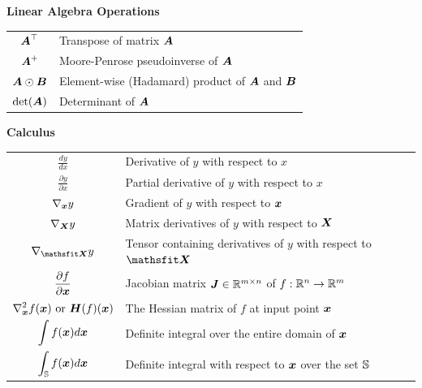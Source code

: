 \vspace{\notationgap}
\noindent\begin{minipage}{\textwidth}
\centerline{\bf Linear Algebra Operations}
\bgroup
\def\arraystretch{1.5}
\begin{tabular}{cp{3.25in}}
$\displaystyle {\bm{A}}^\top$ & Transpose of matrix ${\bm{A}}$ \\
$\displaystyle {\bm{A}}^+$ & Moore-Penrose pseudoinverse of ${\bm{A}}$\\
$\displaystyle {\bm{A}} \odot {\bm{B}} $ & Element-wise (Hadamard) product of ${\bm{A}}$ and ${\bm{B}}$ \\
$\displaystyle \mathrm{det}({\bm{A}})$ & Determinant of ${\bm{A}}$ \\
\end{tabular}
\egroup
{}
\end{minipage}

\vspace{\notationgap}
\noindent\begin{minipage}{\textwidth}
\centerline{\bf Calculus}
\bgroup
\def\arraystretch{1.5}
\begin{tabular}{cp{3.25in}}
$\displaystyle\frac{d y} {d x}$ & Derivative of $y$ with respect to $x$\\ [2ex]
$\displaystyle \frac{\partial y} {\partial x} $ & Partial derivative of $y$ with respect to $x$ \\
$\displaystyle \nabla_{\bm{x}} y $ & Gradient of $y$ with respect to ${\bm{x}}$ \\
$\displaystyle \nabla_{\bm{X}} y $ & Matrix derivatives of $y$ with respect to ${\bm{X}}$ \\
$\displaystyle \nabla_\tX y $ & Tensor containing derivatives of $y$ with respect to $\tX$ \\
$\displaystyle \frac{\partial f}{\partial {\bm{x}}} $ & Jacobian matrix ${\bm{J}} \in \mathbb{R}^{m\times n}$ of $f: \mathbb{R}^n \rightarrow \mathbb{R}^m$\\
$\displaystyle \nabla_{\bm{x}}^2 f({\bm{x}})\text{ or }{\bm{H}}( f)({\bm{x}})$ & The Hessian matrix of $f$ at input point ${\bm{x}}$\\
$\displaystyle \int f({\bm{x}}) d{\bm{x}} $ & Definite integral over the entire domain of ${\bm{x}}$ \\
$\displaystyle \int_{\mathbb{S}} f({\bm{x}}) d{\bm{x}}$ & Definite integral with respect to ${\bm{x}}$ over the set ${\mathbb{S}}$ \\
\end{tabular}
\egroup
{}
\end{minipage}

